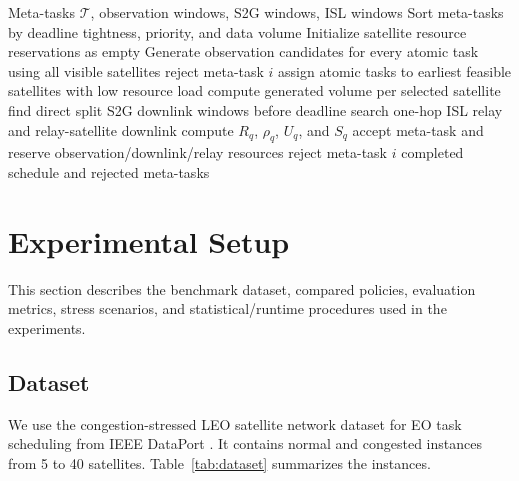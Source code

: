 \documentclass[conference]{IEEEtran}
\begin{document}
\begin{algorithm}[t]
\caption{RACS: Reliability-Aware Congestion-Stressed Scheduling}
\label{alg:racs}
\begin{algorithmic}[1]
\REQUIRE Meta-tasks $\mathcal{T}$, observation windows, S2G windows, ISL windows
\STATE Sort meta-tasks by deadline tightness, priority, and data volume
\STATE Initialize satellite resource reservations as empty
    \STATE Generate observation candidates for every atomic task using all visible satellites
        \STATE reject meta-task $i$
    \ELSE
        \STATE assign atomic tasks to earliest feasible satellites with low resource load
        \STATE compute generated volume per selected satellite
        \STATE find direct split S2G downlink windows before deadline
            \STATE search one-hop ISL relay and relay-satellite downlink
        \ENDIF
            \STATE compute $R_q$, $\rho_q$, $U_q$, and $S_q$
            \STATE accept meta-task and reserve observation/downlink/relay resources
        \ELSE
            \STATE reject meta-task $i$
        \ENDIF
    \ENDIF
\ENDFOR
\RETURN completed schedule and rejected meta-tasks
\end{algorithmic}
\end{algorithm}

\section{Experimental Setup}
This section describes the benchmark dataset, compared policies, evaluation metrics, stress scenarios, and statistical/runtime procedures used in the experiments.

\subsection{Dataset}
We use the congestion-stressed LEO satellite network dataset for EO task scheduling from IEEE DataPort \cite{dataport_eo}. It contains normal and congested instances from 5 to 40 satellites. Table~\ref{tab:dataset} summarizes the instances.
\end{document}
